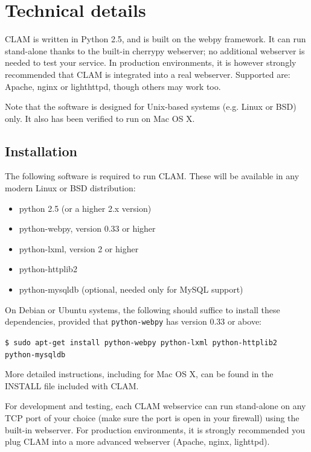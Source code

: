 \documentclass[a4paper,12pt]{report}
\begin{document}
\section{Technical details}

CLAM is written in Python 2.5, and is built on the webpy framework. It can run stand-alone thanks to the built-in cherrypy webserver; no additional webserver is needed to test your service. In production environments, it is however strongly recommended that CLAM is integrated into a real webserver. Supported are: Apache, nginx or lighthttpd, though others may work too.

 Note that the software is designed for Unix-based systems (e.g. Linux or BSD) only. It also has been verified to run on Mac OS X.

\subsection{Installation}

The following software is required to run CLAM. These will be available in any modern Linux or BSD distribution:

\begin{itemize}
\item python 2.5 (or a higher 2.x version)
\item python-webpy, version 0.33 or higher
\item python-lxml, version 2 or higher
\item python-httplib2
\item python-mysqldb (optional, needed only for MySQL support)
\end{itemize}

On Debian or Ubuntu systems, the following should suffice to install these dependencies, provided that \texttt{python-webpy} has version 0.33 or above:

\texttt{\$ sudo apt-get install python-webpy python-lxml python-httplib2 python-mysqldb}

More detailed instructions, including for Mac OS X, can be found in the INSTALL file included with CLAM.

For development and testing, each CLAM webservice can run stand-alone on any TCP port of your choice (make sure the port is open in your firewall) using the built-in webserver. For production environments, it is strongly recommended you plug CLAM into a more advanced webserver (Apache, nginx, lighttpd). 
\end{document}
